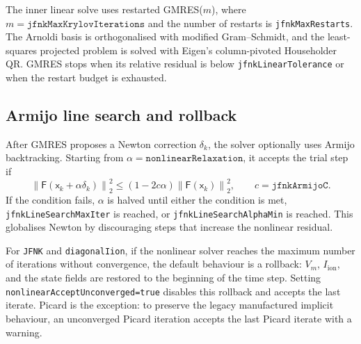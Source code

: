 \documentclass[11pt,a4paper]{article}
\newcommand{\code}[1]{\texttt{\small #1}}
\newcommand{\Vm}{V_m}
\newcommand{\Iion}{I_{\mathrm{ion}}}
\newcommand{\Fres}{\mathsf{F}}
\newcommand{\norm}[1]{\left\lVert #1 \right\rVert}
\begin{document}
The inner linear solve uses restarted GMRES($m$), where
$m=\texttt{jfnkMaxKrylovIterations}$ and the number of restarts is
\code{jfnkMaxRestarts}. The Arnoldi basis is orthogonalised with modified
Gram--Schmidt, and the least-squares projected problem is solved with Eigen's
column-pivoted Householder QR. GMRES stops when its relative residual is below
\code{jfnkLinearTolerance} or when the restart budget is exhausted.

\subsection{Armijo line search and rollback}

After GMRES proposes a Newton correction $\delta_k$, the solver optionally uses
Armijo backtracking. Starting from $\alpha=\texttt{nonlinearRelaxation}$, it
accepts the trial step if
\begin{equation}
  \norm{\Fres(\mathsf{x}_k+\alpha\delta_k)}_2^2
  \le
  \left(1-2c\alpha\right)
  \norm{\Fres(\mathsf{x}_k)}_2^2,
  \qquad c=\texttt{jfnkArmijoC}.
  \label{eq:armijo}
\end{equation}
If the condition fails, $\alpha$ is halved until either the condition is met,
\code{jfnkLineSearchMaxIter} is reached, or
\code{jfnkLineSearchAlphaMin} is reached. This globalises Newton by discouraging
steps that increase the nonlinear residual.

For \code{JFNK} and \code{diagonalIion}, if the nonlinear solver reaches the
maximum number of iterations without convergence, the default behaviour is a
rollback: $\Vm$, $\Iion$, and the state fields are restored to the beginning of
the time step. Setting \code{nonlinearAcceptUnconverged=true} disables this
rollback and accepts the last iterate. Picard is the exception: to preserve the
legacy manufactured implicit behaviour, an unconverged Picard iteration accepts
the last Picard iterate with a warning.
\end{document}
